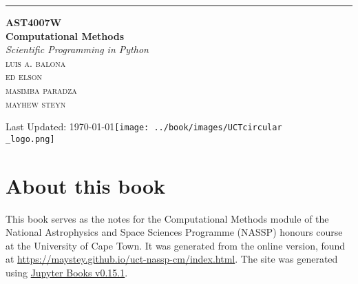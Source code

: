 \begin{titlepage} %
	
	\raggedleft %
	
	\rule{1pt}{\textheight} %
	\hspace{0.05\textwidth} %
	\parbox[b][\textheight][t]{0.75\textwidth}{ %
		\vspace{0.2\textheight}
		{\Huge\bfseries AST4007W} \\[0.5\baselineskip]
		{\Huge\bfseries Computational Methods}
		\\[2\baselineskip] %
		{\large\textit{Scientific Programming in Python}}\\[4\baselineskip] %
		{\Large\textsc{luis a. balona\\ ed elson\\ masimba paradza\\ mayhew steyn}} %
		
		
		\vfill
		Last Updated: \today \hfill \texttt{[image: ../book/images/UCTcircular\\\_logo.png]}\\
		
	}

\end{titlepage}


\section*{About this book}

This book serves as the notes for the Computational Methods module of the National Astrophysics and Space Sciences Programme (NASSP) honours course at the University of Cape Town. It was generated from the online version, found at \url{https://maystey.github.io/uct-nassp-cm/index.html}. The site was generated using \href{https://jupyterbook.org/intro.html}{Jupyter Books v0.15.1}.

